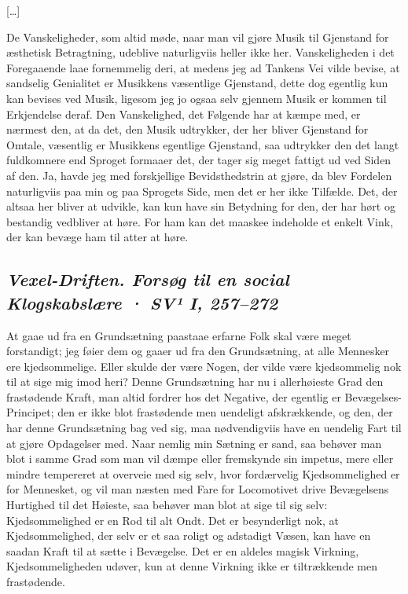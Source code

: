 \documentclass[12pt,a4paper]{article}
\newcommand{\sectionheading}[1]{\subsection*{\normalfont\itshape #1}}
\begin{document}
[…]

De Vanskeligheder, som altid møde, naar man vil gjøre Musik til Gjenstand for æsthetisk Betragtning, udeblive naturligviis heller ikke her. Vanskeligheden i det Foregaaende laae fornemmelig deri, at medens jeg ad Tankens Vei vilde bevise, at sandselig Genialitet er Musikkens væsentlige Gjenstand, dette dog egentlig kun kan bevises ved Musik, ligesom jeg jo ogsaa selv gjennem Musik er kommen til Erkjendelse deraf. Den Vanskelighed, det Følgende har at kæmpe med, er nærmest den, at da det, den Musik udtrykker, der her bliver Gjenstand for Omtale, væsentlig er Musikkens egentlige Gjenstand, saa udtrykker den det langt fuldkomnere end Sproget formaaer det, der tager sig meget fattigt ud ved Siden af den. Ja, havde jeg med forskjellige Bevidsthedstrin at gjøre, da blev Fordelen naturligviis paa min og paa Sprogets Side, men det er her ikke Tilfælde. Det, der altsaa her bliver at udvikle, kan kun have sin Betydning for den, der har hørt og bestandig vedbliver at høre. For ham kan det maaskee indeholde et enkelt Vink, der kan bevæge ham til atter at høre.

\sectionheading{Vexel-Driften. Forsøg til en social Klogskabslære  ·  SV¹ I, 257–272}

At gaae ud fra en Grundsætning paastaae erfarne Folk skal være meget forstandigt; jeg føier dem og gaaer ud fra den Grundsætning, at alle Mennesker ere kjedsommelige. Eller skulde der være Nogen, der vilde være kjedsommelig nok til at sige mig imod heri? Denne Grundsætning har nu i allerhøieste Grad den frastødende Kraft, man altid fordrer hos det Negative, der egentlig er Bevægelses-Principet; den er ikke blot frastødende men uendeligt afskrækkende, og den, der har denne Grundsætning bag ved sig, maa nødvendigviis have en uendelig Fart til at gjøre Opdagelser med. Naar nemlig min Sætning er sand, saa behøver man blot i samme Grad som man vil dæmpe eller fremskynde sin impetus, mere eller mindre tempereret at overveie med sig selv, hvor fordærvelig Kjedsommelighed er for Mennesket, og vil man næsten med Fare for Locomotivet drive Bevægelsens Hurtighed til det Høieste, saa behøver man blot at sige til sig selv: Kjedsommelighed er en Rod til alt Ondt. Det er besynderligt nok, at Kjedsommelighed, der selv er et saa roligt og adstadigt Væsen, kan have en saadan Kraft til at sætte i Bevægelse. Det er en aldeles magisk Virkning, Kjedsommeligheden udøver, kun at denne Virkning ikke er tiltrækkende men frastødende.
\end{document}
